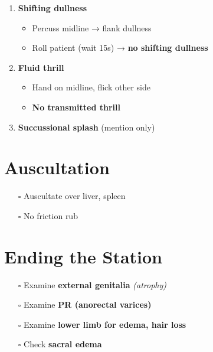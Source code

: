 \documentclass[
  13.5pt,
  a4paper,
  DIV=11,
  numbers=noendperiod]{scrreprt}
\providecommand{\tightlist}{%
  \setlength{\itemsep}{0pt}\setlength{\parskip}{0pt}}
\begin{document}
\begin{enumerate}
\def\labelenumi{\arabic{enumi}.}
\tightlist
\item
  \textbf{Shifting dullness}

  \begin{itemize}
  \tightlist
  \item
    Percuss midline → flank dullness\\
  \item
    Roll patient (wait 15s) → \textbf{no shifting dullness}
  \end{itemize}
\item
  \textbf{Fluid thrill}

  \begin{itemize}
  \tightlist
  \item
    Hand on midline, flick other side\\
  \item
    \textbf{No transmitted thrill}
  \end{itemize}
\item
  \textbf{Succussional splash} (mention only)
\end{enumerate}

\section{Auscultation}\label{auscultation-2}

\begin{itemize}
\tightlist
\item[$\square$]
  Auscultate over liver, spleen\\
\item[$\square$]
  No friction rub
\end{itemize}

\section{Ending the Station}\label{ending-the-station-3}

\begin{itemize}
\tightlist
\item[$\square$]
  Examine \textbf{external genitalia} \emph{(atrophy)}\\
\item[$\square$]
  Examine \textbf{PR (anorectal varices)}\\
\item[$\square$]
  Examine \textbf{lower limb for edema, hair loss}\\
\item[$\square$]
  Check \textbf{sacral edema}
\end{itemize}
\end{document}
